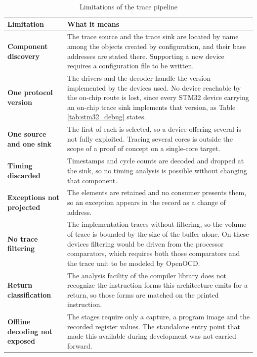 \begin{table}[htbp]
    \centering
    \caption{Limitations of the trace pipeline}
    \label{tab:trace_limits}
    \begin{tabularx}{\linewidth}{| @{}>{\hsize\bfseries}Y | >{\hsize}Y@{} |}
        \hline
        Limitation & \textbf{What it means} \\
        \hline
        Component discovery & The trace source and the trace sink are located by name among the objects created by configuration, and their base addresses are stated there. Supporting a new device requires a configuration file to be written. \\
        \hline
        One protocol version & The drivers and the decoder handle the version implemented by the devices used. No device reachable by the on-chip route is lost, since every STM32 device carrying an on-chip trace sink implements that version, as Table \ref{tab:stm32_debug} states. \\
        \hline
        One source and one sink & The first of each is selected, so a device offering several is not fully exploited. Tracing several cores is outside the scope of a proof of concept on a single-core target. \\
        \hline
        Timing discarded & Timestamps and cycle counts are decoded and dropped at the sink, so no timing analysis is possible without changing that component. \\
        \hline
        Exceptions not projected & The elements are retained and no consumer presents them, so an exception appears in the record as a change of address. \\
        \hline
        No trace filtering & The implementation traces without filtering, so the volume of trace is bounded by the size of the buffer alone. On these devices filtering would be driven from the processor comparators, which requires both those comparators and the trace unit to be modeled by OpenOCD. \\
        \hline
        Return classification & The analysis facility of the compiler library does not recognize the instruction forms this architecture emits for a return, so those forms are matched on the printed instruction. \\
        \hline
        Offline decoding not exposed & The stages require only a capture, a program image and the recorded register values. The standalone entry point that made this available during development was not carried forward. \\
        \hline
    \end{tabularx}
\end{table}

